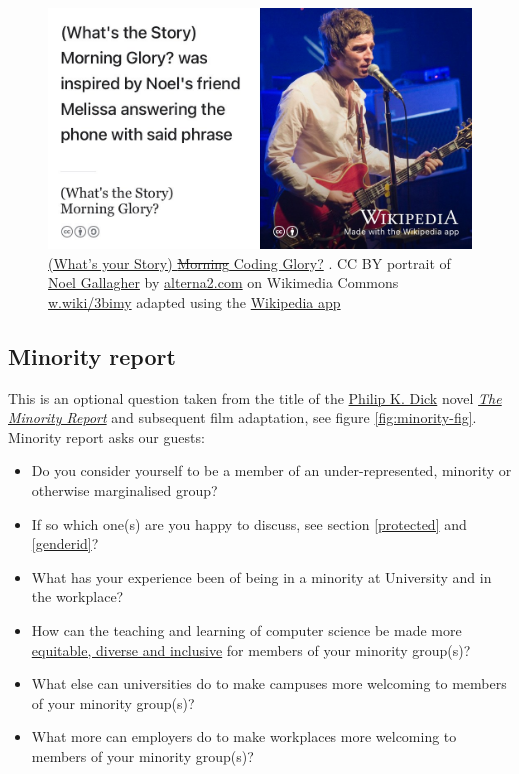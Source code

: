 \documentclass[
]{book}
\providecommand{\tightlist}{%
  \setlength{\itemsep}{0pt}\setlength{\parskip}{0pt}}
\begin{document}
\begin{figure}

{\centering \includegraphics[width=1\linewidth]{images/whats-the-story} 

}

\caption{\href{https://en.wikipedia.org/wiki/(What\%27s_the_Story)_Morning_Glory\%3F}{(What's your Story) \sout{Morning} Coding Glory?} \citep{whatsthestory}. CC BY portrait of \href{https://en.wikipedia.org/wiki/Noel_Gallagher}{Noel Gallagher} by \href{https://alterna2.com/}{alterna2.com} on Wikimedia Commons \href{https://w.wiki/3bim}{w.wiki/3bimy} adapted using the \href{https://apps.apple.com/us/app/wikipedia/id324715238}{Wikipedia app}}\label{fig:gallagher2-fig}
\end{figure}



\hypertarget{minority}{%
\subsection{Minority report}\label{minority}}

This is an optional question taken from the title of the \href{https://en.wikipedia.org/wiki/Philip_K._Dick}{Philip K. Dick} novel \emph{\href{https://en.wikipedia.org/wiki/The_Minority_Report}{The Minority Report}} and subsequent film adaptation, see figure \ref{fig:minority-fig}. Minority report asks our guests:

\begin{itemize}
\tightlist
\item
  Do you consider yourself to be a member of an under-represented, minority or otherwise marginalised group?
\item
  If so which one(s) are you happy to discuss, see section \ref{protected} and \ref{genderid}?
\item
  What has your experience been of being in a minority at University and in the workplace?
\item
  How can the teaching and learning of computer science be made more \href{https://en.wikipedia.org/wiki/Diversity,_equity,_and_inclusion}{equitable, diverse and inclusive} for members of your minority group(s)?
\item
  What else can universities do to make campuses more welcoming to members of your minority group(s)?
\item
  What more can employers do to make workplaces more welcoming to members of your minority group(s)?
\end{itemize}
\end{document}
